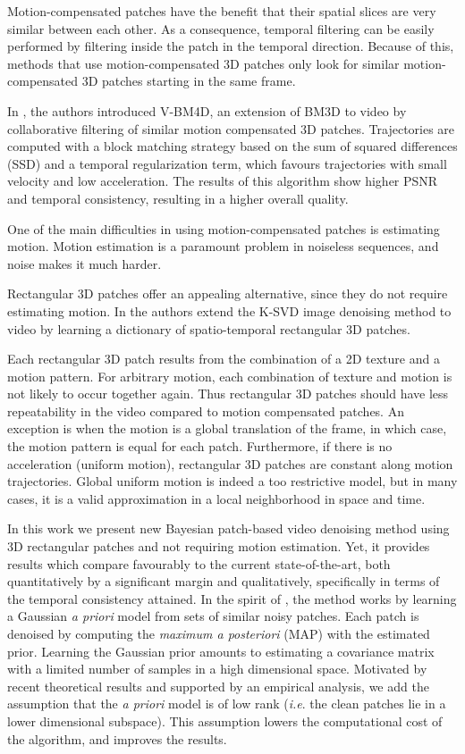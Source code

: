 \documentclass[10pt, journal, twocolumn, final, a4paper]{IEEEtran}
\newcommand{\ie}{\emph{i.e}. } \newcommand{\Ie}{\emph{I.e}. }
\begin{document}
Motion-compensated patches have the benefit that their spatial slices are very
similar between each other. As a consequence, temporal filtering can be easily performed by
filtering inside the patch in the temporal direction. 
Because of this, methods that use motion-compensated 3D patches only look for
similar motion-compensated 3D patches starting in the same frame.


In \cite{Maggioni2011,Maggioni2012}, the authors introduced V-BM4D, an
extension of BM3D to video by collaborative filtering of similar motion
compensated 3D patches. Trajectories are computed with a block matching
strategy based on the sum of squared differences (SSD) and a temporal
regularization term, which favours trajectories with small velocity and low
acceleration. The results of this algorithm show higher PSNR and temporal
consistency, resulting in a higher overall quality.

One of the main difficulties in using motion-compensated patches is estimating
motion. Motion estimation is a paramount problem in noiseless sequences, and
noise makes it much harder.

Rectangular 3D patches offer an appealing
alternative, since they do not require estimating motion. 
In \cite{Protter2007,Protter2009} the authors extend the K-SVD \cite{Elad2006}
image denoising method to video by learning a dictionary of spatio-temporal
rectangular 3D patches.

Each rectangular 3D patch results from the combination of a 2D texture and a
motion pattern. For arbitrary motion, each combination of texture and motion is
not likely to occur together again. Thus rectangular 3D patches should have
less repeatability in the video compared to motion compensated patches.  An
exception is when the motion is a global translation of the frame, in which
case, the motion pattern is equal for each patch. Furthermore, if there is no
acceleration (uniform motion), rectangular 3D patches are constant along motion
trajectories. Global uniform motion is indeed a too restrictive model, but in
many cases, it is a valid approximation in a local neighborhood in space and
time.

\bigskip

In this work we present new Bayesian patch-based video denoising method using
3D rectangular patches and not requiring motion estimation.
Yet, it provides
results which compare favourably to the current state-of-the-art,
both quantitatively by a significant margin and qualitatively, specifically in
terms of the temporal consistency attained.
In the spirit of  \cite{Lebrun2013a,Lebrun2013ipol},
the method works by learning a Gaussian \emph{a priori} model from sets of 
similar noisy patches. Each patch is denoised by computing the \emph{maximum a
posteriori} (MAP) with the estimated prior.
Learning the Gaussian prior amounts to estimating a covariance matrix with a
limited number of samples in a high dimensional space. Motivated by recent 
theoretical results and supported by an empirical analysis, we add the 
assumption that the \emph{a priori} model is of low rank (\ie the clean patches
lie in a lower dimensional subspace). This assumption lowers the computational cost
of the algorithm, and improves the results.
\end{document}
